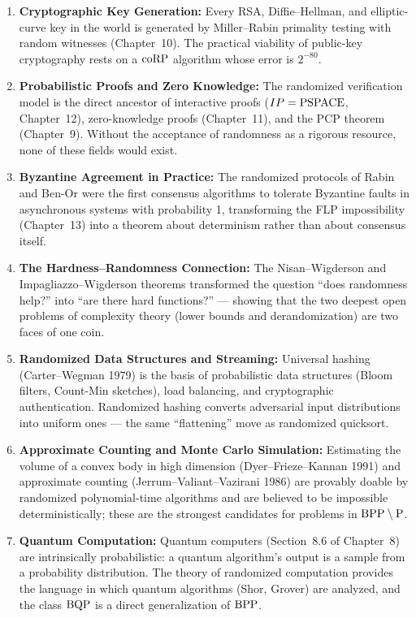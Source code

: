 \begin{enumerate}
\item \textbf{Cryptographic Key Generation:} Every RSA, Diffie--Hellman, and elliptic-curve key in the world is generated by Miller--Rabin primality testing with random witnesses (Chapter~10). The practical viability of public-key cryptography rests on a $\text{coRP}$ algorithm whose error is $2^{-80}$.

\item \textbf{Probabilistic Proofs and Zero Knowledge:} The randomized verification model is the direct ancestor of interactive proofs ($IP = \text{PSPACE}$, Chapter~12), zero-knowledge proofs (Chapter~11), and the PCP theorem (Chapter~9). Without the acceptance of randomness as a rigorous resource, none of these fields would exist.

\item \textbf{Byzantine Agreement in Practice:} The randomized protocols of Rabin and Ben-Or were the first consensus algorithms to tolerate Byzantine faults in asynchronous systems with probability 1, transforming the FLP impossibility (Chapter~13) into a theorem about determinism rather than about consensus itself.

\item \textbf{The Hardness--Randomness Connection:} The Nisan--Wigderson and Impagliazzo--Wigderson theorems transformed the question ``does randomness help?'' into ``are there hard functions?'' --- showing that the two deepest open problems of complexity theory (lower bounds and derandomization) are two faces of one coin.

\item \textbf{Randomized Data Structures and Streaming:} Universal hashing (Carter--Wegman 1979) is the basis of probabilistic data structures (Bloom filters, Count-Min sketches), load balancing, and cryptographic authentication. Randomized hashing converts adversarial input distributions into uniform ones --- the same ``flattening'' move as randomized quicksort.

\item \textbf{Approximate Counting and Monte Carlo Simulation:} Estimating the volume of a convex body in high dimension (Dyer--Frieze--Kannan 1991) and approximate counting (Jerrum--Valiant--Vazirani 1986) are provably doable by randomized polynomial-time algorithms and are believed to be impossible deterministically; these are the strongest candidates for problems in $\text{BPP} \setminus \text{P}$.

\item \textbf{Quantum Computation:} Quantum computers (Section~8.6 of Chapter~8) are intrinsically probabilistic: a quantum algorithm's output is a sample from a probability distribution. The theory of randomized computation provides the language in which quantum algorithms (Shor, Grover) are analyzed, and the class $\text{BQP}$ is a direct generalization of $\text{BPP}$.
\end{enumerate}

